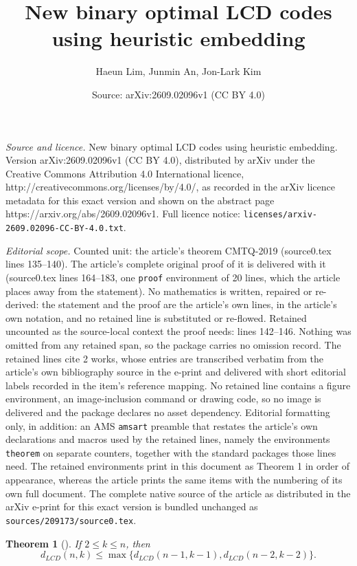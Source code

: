 \documentclass[10pt,a4paper]{amsart}
\title{New binary optimal LCD codes using heuristic embedding}
\author{Haeun Lim, Junmin An, Jon-Lark Kim}
\date{Source: arXiv:2609.02096v1 (CC BY 4.0)}
\newtheorem{theorem}{Theorem}
\begin{document}
\maketitle

\noindent\emph{Source and licence.} New binary optimal LCD codes using heuristic embedding. Version arXiv:2609.02096v1 (CC BY 4.0), distributed by arXiv under the Creative Commons Attribution 4.0 International licence, http://creativecommons.org/licenses/by/4.0/, as recorded in the arXiv licence metadata for this exact version and shown on the abstract page https://arxiv.org/abs/2609.02096v1. Full licence notice: \texttt{licenses/arxiv-2609.02096-CC-BY-4.0.txt}.\par\smallskip

\noindent\textit{Editorial scope.} Counted unit: the article's theorem CMTQ-2019 (source0.tex lines 135--140). The article's complete original proof of it is delivered with it (source0.tex lines 164--183, one \texttt{proof} environment of 20 lines, which the article places away from the statement). No mathematics is written, repaired or re-derived: the statement and the proof are the article's own lines, in the article's own notation, and no retained line is substituted or re-flowed.  Retained uncounted as the source-local context the proof needs: lines 142--146.  Nothing was omitted from any retained span, so the package carries no omission record.  The retained lines cite 2 works, whose entries are transcribed verbatim from the article's own bibliography source in the e-print and delivered with short editorial labels recorded in the item's reference mapping.  No retained line contains a figure environment, an image-inclusion command or drawing code, so no image is delivered and the package declares no asset dependency.  Editorial formatting only, in addition: an AMS \texttt{amsart} preamble that restates the article's own declarations and macros used by the retained lines, namely the environments \texttt{theorem} on separate counters, together with the standard packages those lines need.  The retained environments print in this document as Theorem 1 in order of appearance, whereas the article prints the same items with the numbering of its own full document.  The complete native source of the article as distributed in the arXiv e-print for this exact version is bundled unchanged as \texttt{sources/209173/source0.tex}.
\begin{theorem}[\cite{LSL-2024}]\label{LCD-finite}
    If $2 \leq k \leq n$, then \[
    d_{LCD}(n,k) \leq \max \{d_{LCD}(n-1, k-1), d_{LCD}(n-2, k-2)\}.
    \]
\end{theorem}
\end{document}
